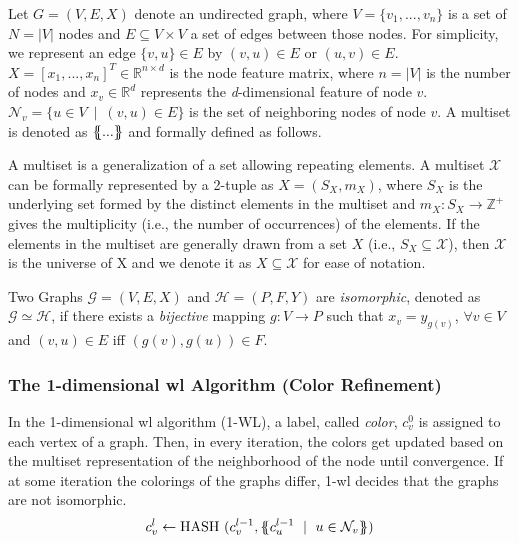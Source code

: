 Let $G = (V,E, X)$ denote an undirected graph, where $V =\{v_{1},...,v_{n}\}$ is a set of $ N = |V|$ nodes and $E \subseteq V\times V $ a set of edges between those nodes. For simplicity, we represent an edge $\{v,u\} \in E$ by $(v,u) \in E$ or $(u,v)\in E$. $X= [x_{1},...,x_{n}]^{T} \in \mathbb{R}^{n \times d}$ is the node feature matrix, where $n = |V|$ is the number of nodes and $x_{v} \in \mathbb{R}^{d}$ represents the \textit{d}-dimensional feature of node $v$. $\mathcal{N}_{v}= \{u \in V\ \mid \ (v,u) \in E\}$ is the set of neighboring nodes of node $v$. A multiset is denoted
as $\ldblbrace...\rdblbrace$ and formally defined as follows.
\begin{defn}[Multiset]
    A multiset is a generalization of a set allowing repeating elements. A multiset $\mathcal{X}$ can be formally represented by a 2-tuple as $X = (S_{X}, m_{X})$, where $S_{X}$ is the
    underlying set formed by the distinct elements in the multiset and $m_{X}:S_{X} \rightarrow
        \mathbb{Z}^{+}$ gives the multiplicity (i.e., the number of occurrences) of the elements.
    If the elements in the multiset are generally drawn from a set $X$ (i.e., $S_{X} \subseteq \mathcal{X}$), then $\mathcal{X}$ is the universe of X and we denote it as $X \subseteq \mathcal{X}$ for ease of notation.
\end{defn}
\begin{defn}[Isomorphism]
    Two Graphs $\mathcal{G}= (V,E,X)$ and $\mathcal{H}= (P,F,Y)$ are \textit{isomorphic}, denoted as $\mathcal{G} \simeq \mathcal{H}$, if there exists a \textit{bijective} mapping $g: V \rightarrow P$ such that $x_{v}= y_{g(v)}$, $\forall v \in V$ and $(v,u) \in E$ iff $(g(v),g(u)) \in F$.
\end{defn}
\subsubsection{The 1-dimensional \acs*{wl} Algorithm (Color Refinement)}
In the 1-dimensional \ac{wl} algorithm (1-WL), a label, called \emph{color}, $c_{v}^{0}$ is assigned to each vertex of a graph. Then, in every iteration, the colors get updated based on the multiset representation of the neighborhood of the node until convergence. If at some iteration the colorings of the graphs differ, 1-\ac{wl} decides that the graphs are not isomorphic.
\begin{align*}
    c_{v}^{l} \leftarrow \mathrm{HASH}\ (c_{v}^{l-1}, \ldblbrace c_{u}^{l-1}\ \mid \ u \in \mathcal{N}_{v} \rdblbrace)
\end{align*}
\\

